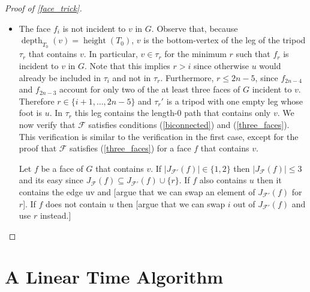 \documentclass{patmorin}
\DeclareMathOperator{\height}{height}
\DeclareMathOperator{\depth}{depth}
\begin{document}
\begin{proof}[Proof of \cref{face_trick}]
\begin{itemize}
    For each $j\in\{0,\ldots,i-1\}$, $G_j=G_j'$ and $\tau_j=\tau_j'$ so it suffices to check conditions (\ref{biconnected}) and (\ref{three_faces}) for $j\in\{i,\ldots,2n-3\}$. Furthermore, $G_{2n-3}=G_{2n-4}=G_{2n-5}$, so it suffices to verify (\ref{biconnected}) and (\ref{three_faces}) for $j\in\{i,\ldots,2n-5\}$.

    Each such $G_j$ is obtained from $G_j'$ by subdividing a single edge (the edge between $u$ and its $T_0$-parent). This immediately implies that each such $G_j$ is biconnected and therefore satisfies (\ref{biconnected}).

    Next, consider some face $f$ of $G_j$.  If $f$ does not contain $v$ then it does not contain any edge incident to $v$.  Therefore $J_{\mathcal{F}'}(f)=J_{\mathcal{F}}(f)$ so $f$ satisfies (\ref{three_faces}) by the inductive hypothesis. If $f$ does contain $v$ then the corresponding face $f'$ in $G'$ contains $u$, so $J_{\mathcal{F}'}(f)$ contains $i$ and it is straightforward to check that $J_{\mathcal{F}}(f)=J_{\mathcal{F'}}(f)$ and $f$ satisifies (\ref{three_faces}).

    \item The face $f_i$ is not incident to $v$ in $G$.  Observe that, because $\depth_{T_0}(v)=\height(T_0)$, $v$ is the bottom-vertex of the leg of the tripod $\tau_r$ that contains $v$.  In particular, $v\in\tau_r$ for the minimum $r$ such that $f_r$ is incident to $v$ in $G$.  Note that this implies $r>i$ since otherwise $u$ would already be included in $\tau_i$ and not in $\tau_r$.  Furthermore, $r\le 2n-5$, since  $f_{2n-4}$ and $f_{2n-3}$ account for only two of the at least three faces of $G$ incident to $v$.  Therefore $r\in\{i+1,\ldots,2n-5\}$ and $\tau_r'$ is a tripod with one empty leg whose foot is $u$.  In $\tau_r$ this leg contains the length-$0$ path that contains only $v$.  We now verify that $\mathcal{F}$ satisfies conditions (\ref{biconnected}) and (\ref{three_faces}).  This verification is similar to the verification in the first case, except for the proof that $\mathcal{F}$ satisfies (\ref{three_faces}) for a face $f$ that contains $v$.

    Let $f$ be a face of $G$ that contains $v$.  If $|J_{\mathcal{F}'}(f)|\in\{1,2\}$ then $|J_{\mathcal{F}}(f)|\le 3$ and its easy since $J_{\mathcal{F}}(f)\subseteq J_{\mathcal{F'}}(f)\cup\{r\}$.  If $f$ also contains $u$ then it contains the edge uv and [argue that we can swap an element of $J_{\mathcal{F}'}(f)$ for $r$].  If $f$ does not contain $u$ then [argue that we can swap $i$ out of $J_{\mathcal{F}'}(f)$ and use $r$ instead.]  \qedhere
  \end{itemize}
\end{proof}


\section{A Linear Time Algorithm}




\end{document}
